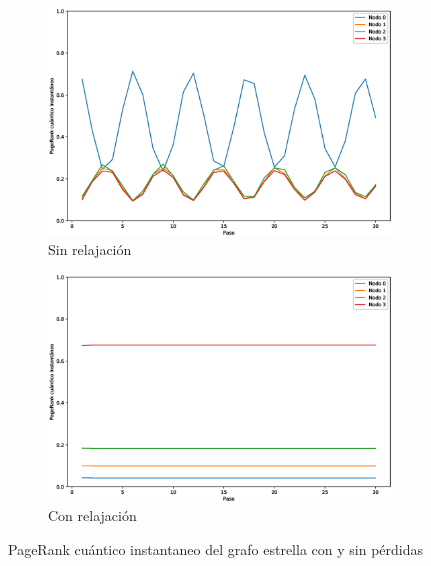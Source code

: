 \documentclass[xetex,mathserif,serif]{beamer}
\begin{document}
\begin{frame}
\begin{figure}[H]
    \centering
    \begin{subfigure}[m]{0.45\textwidth}
        \centering
        \includegraphics[width=0.9\linewidth]{img/star-inst-lossless.eps}
        \caption{Sin relajación}
    \end{subfigure}
    \begin{subfigure}[m]{0.45\textwidth}
        \centering
        \includegraphics[width=0.9\linewidth]{img/star-inst-lossy.eps}
        \caption{Con relajación}
    \end{subfigure}
    \caption[PageRank cuántico instantaneo del grafo estrella con y sin pérdidas]{PageRank cuántico instantaneo del grafo estrella con y sin pérdidas}
    \label{fig:inststarlossy}
\end{figure}


\end{frame}
\end{document}

